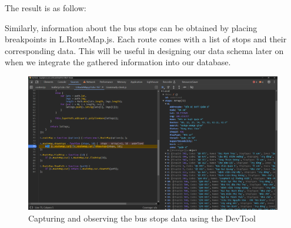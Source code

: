 The result is as follow:
\begin{figure}[H]
    \centering
    \hspace{0.5cm} %
\end{figure}

Similarly, information about the bus stops can be obtained by placing breakpoints in L.RouteMap.js. Each route comes with a list of stops and their corresponding data. This will be useful in designing our data schema later on when we integrate the gathered information into our database.

\begin{figure}[H]
    \includegraphics[width=\textwidth]{assets/images/Research/Bus/stop_web.png}
    \caption{Capturing and observing the bus stops data using the DevTool}
    \label{fig:stop_data}
\end{figure}

